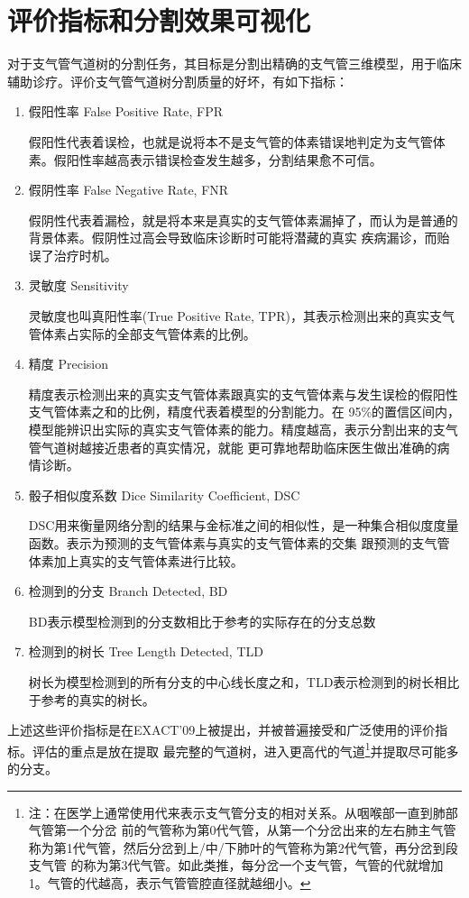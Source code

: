 \section{评价指标和分割效果可视化}
对于支气管气道树的分割任务，其目标是分割出精确的支气管三维模型，用于临床辅助诊疗。评价支气管气道树分割质量的好坏，有如下指标：
\begin{enumerate}
    \item 假阳性率 False Positive Rate, FPR
    
    假阳性代表着误检，也就是说将本不是支气管的体素错误地判定为支气管体素。假阳性率越高表示错误检查发生越多，分割结果愈不可信。
    
    \item 假阴性率 False Negative Rate, FNR
    
    假阴性代表着漏检，就是将本来是真实的支气管体素漏掉了，而认为是普通的背景体素。假阴性过高会导致临床诊断时可能将潜藏的真实
    疾病漏诊，而贻误了治疗时机。
    
    \item 灵敏度 Sensitivity
    
    灵敏度也叫真阳性率(True Positive Rate, TPR)，其表示检测出来的真实支气管体素占实际的全部支气管体素的比例。 
    
    \item 精度 Precision
    
    精度表示检测出来的真实支气管体素跟真实的支气管体素与发生误检的假阳性支气管体素之和的比例，精度代表着模型的分割能力。在
    95\%的置信区间内，模型能辨识出实际的真实支气管体素的能力。精度越高，表示分割出来的支气管气道树越接近患者的真实情况，就能
    更可靠地帮助临床医生做出准确的病情诊断。
    
    \item 骰子相似度系数 Dice Similarity Coefficient, DSC
    
    DSC用来衡量网络分割的结果与金标准之间的相似性，是一种集合相似度度量函数。表示为预测的支气管体素与真实的支气管体素的交集
    跟预测的支气管体素加上真实的支气管体素进行比较。
    
    \item 检测到的分支 Branch Detected, BD
    
    BD表示模型检测到的分支数相比于参考的实际存在的分支总数
    
    \item 检测到的树长 Tree Length Detected, TLD
    
    树长为模型检测到的所有分支的中心线长度之和，TLD表示检测到的树长相比于参考的真实的树长。
\end{enumerate}
上述这些评价指标是在EXACT'09\cite{Lo2012ExtractionOA}上被提出，并被普遍接受和广泛使用的评价指标。评估的重点是放在提取
最完整的气道树，进入更高代的气道\footnote{注：在医学上通常使用代来表示支气管分支的相对关系。从咽喉部一直到肺部气管第一个分岔
前的气管称为第0代气管，从第一个分岔出来的左右肺主气管称为第1代气管，然后分岔到上/中/下肺叶的气管称为第2代气管，再分岔到段支气管
的称为第3代气管。如此类推，每分岔一个支气管，气管的代就增加1。气管的代越高，表示气管管腔直径就越细小。}并提取尽可能多的分支。

